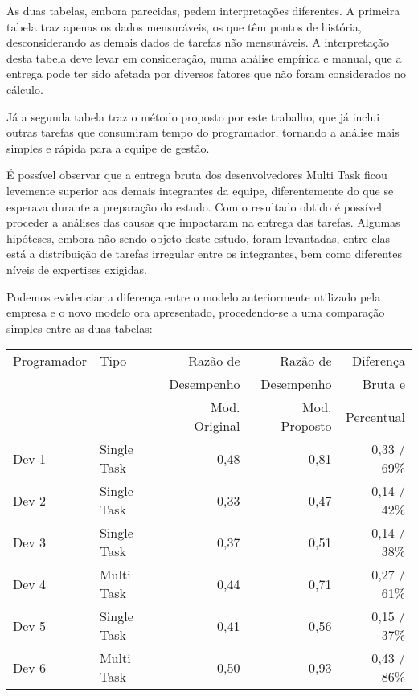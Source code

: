 As duas tabelas, embora parecidas, pedem interpretações diferentes. A primeira tabela traz apenas os dados mensuráveis, os que têm pontos de história, desconsiderando as demais dados de tarefas não mensuráveis. A interpretação desta tabela deve levar em consideração, numa análise empírica e manual, que a entrega pode ter sido afetada por diversos fatores que não foram considerados no cálculo.\par
Já a segunda tabela traz o método proposto por este trabalho, que já inclui outras tarefas que consumiram tempo do programador, tornando a análise mais simples e rápida para a equipe de gestão. \par 
É possível observar que a entrega bruta dos desenvolvedores Multi Task ficou levemente superior aos demais integrantes da equipe, diferentemente do que se esperava durante a preparação do estudo. Com o resultado obtido é possível proceder a análises das causas que impactaram na entrega das tarefas. Algumas hipóteses, embora não sendo objeto deste estudo, foram levantadas, entre elas está a distribuição de tarefas irregular entre os integrantes, bem como diferentes níveis de expertises exigidas.\par

Podemos evidenciar a diferença entre o modelo anteriormente utilizado pela empresa e o novo modelo ora apresentado, procedendo-se a uma comparação simples entre as duas tabelas:

\begin{center}
\begin{tabular}{ | l | l | r | r | r | } 
 \hline
 Programador & Tipo & Razão de & Razão de & Diferença \\ 
 & & Desempenho & Desempenho & Bruta e  \\ 
 & & Mod. Original & Mod. Proposto & Percentual \\ \hline
 Dev 1 & Single Task & 0,48 & 0,81 & 0,33 / 69\% \\
 Dev 2 & Single Task & 0,33 & 0,47 & 0,14 / 42\% \\
 Dev 3 & Single Task & 0,37 & 0,51 & 0,14 / 38\% \\
 Dev 4 & Multi Task & 0,44 & 0,71 & 0,27 / 61\% \\
 Dev 5 & Single Task & 0,41 & 0,56 & 0,15 / 37\% \\
 Dev 6 & Multi Task & 0,50 & 0,93 & 0,43 / 86\% \\
 \hline
\end{tabular}
\end{center}


